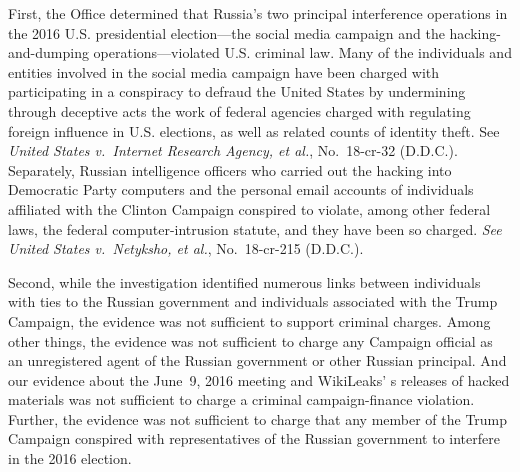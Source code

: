 First, the Office determined that Russia's two principal interference operations in the 2016 U.S. presidential election---the social media campaign and the hacking-and-dumping operations---violated U.S. criminal law.
Many of the individuals and entities involved in the social media campaign have been charged with participating in a conspiracy to defraud the United States by undermining through deceptive acts the work of federal agencies charged with regulating foreign influence in U.S. elections, as well as related counts of identity theft. See \textit{United States v.\ Internet Research Agency, et al.}, No.~18-cr-32 (D.D.C.).
Separately, Russian intelligence officers who carried out the hacking into Democratic Party computers and the personal email accounts of individuals affiliated with the Clinton Campaign conspired to violate, among other federal laws, the federal computer-intrusion statute, and they have been so charged.
\textit{See United States v.\ Netyksho, et al.}, No.~18-cr-215 (D.D.C.).


Second, while the investigation identified numerous links between individuals with ties to the Russian government and individuals associated with the Trump Campaign, the evidence was not sufficient to support criminal charges.
Among other things, the evidence was not sufficient to charge any Campaign official as an unregistered agent of the Russian government or other Russian principal.
And our evidence about the June~9, 2016 meeting and WikiLeaks' s releases of hacked materials was not sufficient to charge a criminal campaign-finance violation.
Further, the evidence was not sufficient to charge that any member of the Trump Campaign conspired with representatives of the Russian government to interfere in the 2016 election.

